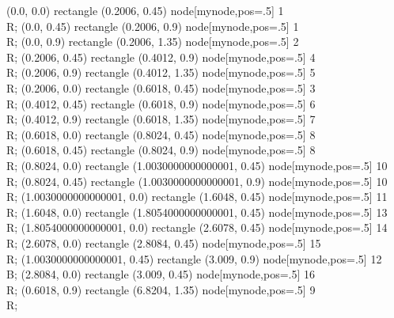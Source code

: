  (0.0, 0.0) rectangle (0.2006, 0.45) node[mynode,pos=.5] {1 \\ R};
 (0.0, 0.45) rectangle (0.2006, 0.9) node[mynode,pos=.5] {1 \\ R};
 (0.0, 0.9) rectangle (0.2006, 1.35) node[mynode,pos=.5] {2 \\ R};
 (0.2006, 0.45) rectangle (0.4012, 0.9) node[mynode,pos=.5] {4 \\ R};
 (0.2006, 0.9) rectangle (0.4012, 1.35) node[mynode,pos=.5] {5 \\ R};
 (0.2006, 0.0) rectangle (0.6018, 0.45) node[mynode,pos=.5] {3 \\ R};
 (0.4012, 0.45) rectangle (0.6018, 0.9) node[mynode,pos=.5] {6 \\ R};
 (0.4012, 0.9) rectangle (0.6018, 1.35) node[mynode,pos=.5] {7 \\ R};
 (0.6018, 0.0) rectangle (0.8024, 0.45) node[mynode,pos=.5] {8 \\ R};
 (0.6018, 0.45) rectangle (0.8024, 0.9) node[mynode,pos=.5] {8 \\ R};
 (0.8024, 0.0) rectangle (1.0030000000000001, 0.45) node[mynode,pos=.5] {10 \\ R};
 (0.8024, 0.45) rectangle (1.0030000000000001, 0.9) node[mynode,pos=.5] {10 \\ R};
 (1.0030000000000001, 0.0) rectangle (1.6048, 0.45) node[mynode,pos=.5] {11 \\ R};
 (1.6048, 0.0) rectangle (1.8054000000000001, 0.45) node[mynode,pos=.5] {13 \\ R};
 (1.8054000000000001, 0.0) rectangle (2.6078, 0.45) node[mynode,pos=.5] {14 \\ R};
 (2.6078, 0.0) rectangle (2.8084, 0.45) node[mynode,pos=.5] {15 \\ R};
 (1.0030000000000001, 0.45) rectangle (3.009, 0.9) node[mynode,pos=.5] {12 \\ B};
 (2.8084, 0.0) rectangle (3.009, 0.45) node[mynode,pos=.5] {16 \\ R};
 (0.6018, 0.9) rectangle (6.8204, 1.35) node[mynode,pos=.5] {9 \\ R};
